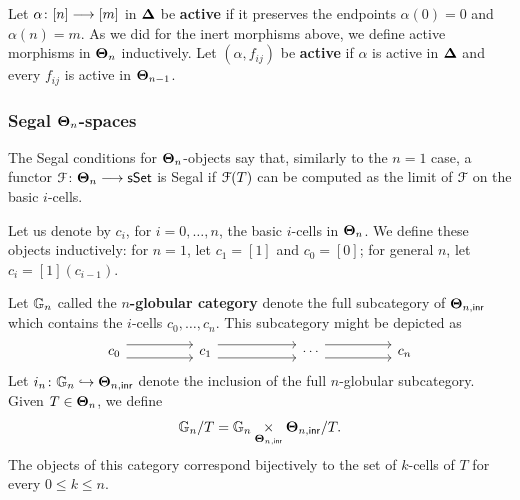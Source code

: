\begin{definition}
    Let $\alpha \colon [n] \longrightarrow [m]$ in $\mathbf\Delta$ be \textbf{active} if it preserves the endpoints $\alpha(0) = 0$ and $\alpha(n) = m$. As we did for the inert morphisms above, we define active morphisms in $\mathbf\Theta_n$ inductively. Let $(\alpha, f_{ij})$ be \textbf{active} if $\alpha$ is active in $\mathbf\Delta$ and every $f_{ij}$ is active in $\mathbf\Theta_{n-1}$.
\end{definition}


\subsubsection{Segal \texorpdfstring{$\mathbf\Theta_n$}{Theta_n}-spaces}

The Segal conditions for $\mathbf\Theta_n$-objects say that, similarly to the $n=1$ case, a functor $\mathcal F\colon \mathbf\Theta_n \longrightarrow \operatorname{\sf sSet}$ is Segal if $\mathcal F(T)$ can be computed as the limit of $\mathcal F$ on the basic $i$-cells.

\begin{definition}
    Let us denote by $c_i$, for $i=0,\ldots,n$, the basic $i$-cells in $\mathbf\Theta_n$. We define these objects inductively: for $n=1$, let $c_1 = [1]$ and $c_0 = [0]$; for general $n$, let $c_i = [1](c_{i-1})$.
\end{definition}


\begin{definition}
    Let $\mathbb G_n$ called the \textbf{$n$-globular category} denote the full subcategory of $\mathbf\Theta_{n,\mathsf{inr}}$ which contains the $i$-cells $c_0,\ldots,c_n$. This subcategory might be depicted as 
    \begin{equation}
        \begin{tikzcd}[ampersand replacement=\&]
            {c_0} \&\& {c_1} \& {} \& \cdots \&\& {c_n}
            \arrow[shift right=2, from=1-1, to=1-3]
            \arrow[shift left=2, from=1-1, to=1-3]
            \arrow[shift right=2, from=1-3, to=1-5]
            \arrow[shift left=2, from=1-3, to=1-5]
            \arrow[shift right=2, from=1-5, to=1-7]
            \arrow[shift left=2, from=1-5, to=1-7]
        \end{tikzcd}
    \end{equation}  
    Let $i_n \colon \mathbb G_n \hookrightarrow \mathbf\Theta_{n,\mathsf{inr}}$ denote the inclusion of the full $n$-globular subcategory. Given $T\in \mathbf\Theta_n$, we define
    \begin{equation}
        \mathbb G_n /T = \mathbb G_n \underset{\mathbf\Theta_{n,\mathsf{inr}}}{\times} \mathbf\Theta_{n,\mathsf{inr}}/ T.
    \end{equation} 
    The objects of this category correspond bijectively to the set of $k$-cells of $T$ for every $0\leq k \leq n$. 
\end{definition}

